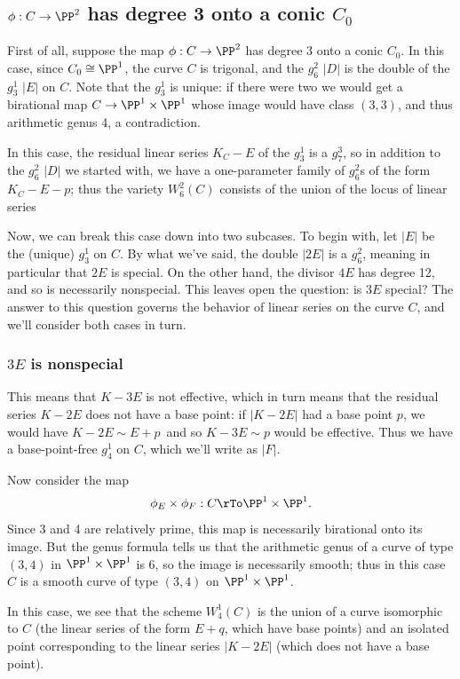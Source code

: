 \subsection{$\phi : C \to \PP^2$ has degree 3 onto a conic $C_0$}

First of all, suppose the map $\phi : C \to \PP^2$ has degree 3 onto a conic $C_0$. In this case, since $C_0 \cong \PP^1$, the curve $C$ is trigonal, and the $g^2_6$ $|D|$ is the double of the $g^1_3$ $|E|$ on $C$. Note that the $g^1_3$ is unique: if there were two we would get a birational map $C \to \PP^1\times \PP^1$ whose image would have class $(3,3)$, and thus
arithmetic genus 4, a contradiction.

In this case, the residual linear series $K_C - E$ of the $g^1_3$ is a $g^3_7$, so in addition to the $g^2_6$ $|D|$ we started with, we have a one-parameter family of $g^2_6$s of the form  $K_C - E - p$; thus the variety $W^2_6(C)$ consists of the union of the locus of linear series 

Now, we can break this case down into two subcases. To begin with, let $|E|$ be the (unique) $g^1_3$ on $C$. By what we've said, the double $|2E|$ is a $g^2_6$, meaning in particular that $2E$ is special. On the other hand, the divisor $4E$ has degree 12, and so is necessarily nonspecial. This leaves open the question: is $3E$ special? The answer to this question governs the behavior of linear series on the curve $C$, and we'll consider both cases in turn.

\subsubsection{$3E$ is nonspecial} This means that $K-3E$ is not effective, which in turn means that the residual series $K-2E$ does not have a base point: if $|K-2E|$ had a base point $p$, we would have $K - 2E \sim E + p$\, and so $K-3E \sim p$ would be effective. Thus we have a base-point-free $g^1_4$ on $C$, which we'll write as $|F|$.

Now consider the map
$$
\phi_E \times \phi_F : C \rTo \PP^1 \times \PP^1.
$$
Since 3 and 4 are relatively prime, this map is necessarily birational onto its image. But the genus formula tells us that the arithmetic genus of a curve of type $(3,4)$ in $\PP^1 \times \PP^1$ is 6, so the image is necessarily smooth; thus in this case $C$ is a smooth curve of type $(3,4)$ on $\PP^1 \times \PP^1$.

In this case, we see that the scheme $W^1_4(C)$ is the union of a curve isomorphic to $C$ (the linear series of the form $E + q$, which have base points) and an isolated point corresponding to the linear series $|K - 2E|$ (which does not have a base point).

